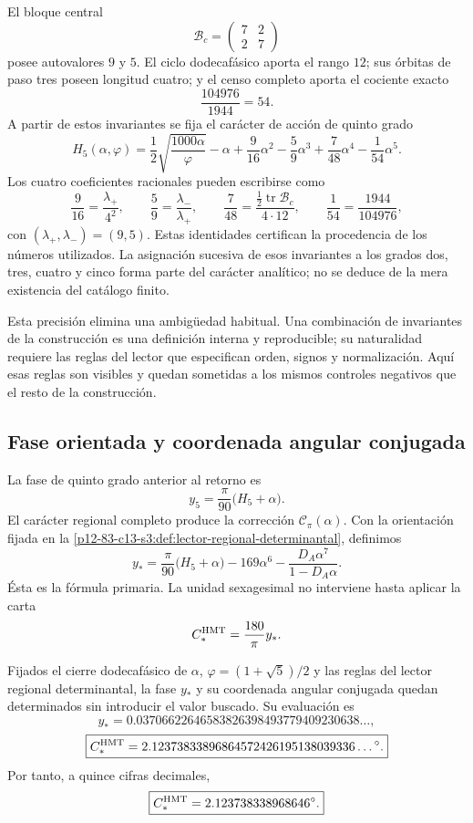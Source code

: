 El bloque central
\[
\mathcal B_c=\begin{pmatrix}7&2\\2&7\end{pmatrix}
\]
posee autovalores \(9\) y \(5\). El ciclo dodecafásico aporta el rango
\(12\); sus órbitas de paso tres poseen longitud cuatro; y el censo completo
aporta el cociente exacto
\[
\frac{104976}{1944}=54.
\]
A partir de estos invariantes se fija el carácter de acción de quinto grado
\[
\boxed{
H_5(\alpha,\varphi)
=\frac12\sqrt{\frac{1000\alpha}{\varphi}}-\alpha
+\frac9{16}\alpha^2-\frac59\alpha^3
+\frac7{48}\alpha^4-\frac1{54}\alpha^5.}
\]
Los cuatro coeficientes racionales pueden escribirse como
\[
\frac9{16}=\frac{\lambda_+}{4^2},
\qquad
\frac59=\frac{\lambda_-}{\lambda_+},
\qquad
\frac7{48}=\frac{\tfrac12\operatorname{tr}\mathcal B_c}{4\cdot12},
\qquad
\frac1{54}=\frac{1944}{104976},
\]
con \((\lambda_+,\lambda_-)=(9,5)\). Estas identidades certifican la
procedencia de los números utilizados. La asignación sucesiva de esos
invariantes a los grados dos, tres, cuatro y cinco forma parte del carácter
analítico; no se deduce de la mera existencia del catálogo finito.

Esta precisión elimina una ambigüedad habitual. Una combinación de
invariantes de la construcción es una definición interna y reproducible; su
naturalidad requiere las reglas del lector que especifican orden, signos y
normalización. Aquí esas reglas son visibles y quedan sometidas a los mismos
controles negativos que el resto de la construcción.

\subsection{Fase orientada y coordenada angular conjugada}

La fase de quinto grado anterior al retorno es
\[
y_5=\frac\pi{90}\bigl(H_5+\alpha\bigr).
\]
El carácter regional completo produce la corrección
\(\mathscr C_\pi(\alpha)\). Con la orientación fijada en la
\cref{p12-83-c13-s3:def:lector-regional-determinantal}, definimos
\[
\boxed{
y_*=\frac\pi{90}\bigl(H_5+\alpha\bigr)
-169\alpha^6
-\frac{D_A\alpha^7}{1-D_A\alpha}.}
\]
Ésta es la fórmula primaria. La unidad sexagesimal no interviene hasta aplicar la carta
\[
C_*^{\rm HMT}=\frac{180}{\pi}y_*.
\]

\begin{theorem}
\label{p12-83-c13-s3:thm:contraangulo-regional}
Fijados el cierre dodecafásico de \(\alpha\),
\(\varphi=(1+\sqrt5)/2\) y las reglas del lector regional determinantal, la
fase \(y_*\) y su coordenada angular conjugada quedan determinados sin introducir el valor
buscado. Su evaluación es
\[
\boxed{
y_*=0.03706622646583826398493779409230638\ldots,}
\]
\[
\boxed{
C_*^{\rm HMT}
=2.12373833896864572426195138039336\ldots{}^\circ.}
\]
Por tanto, a quince cifras decimales,
\[
\boxed{C_*^{\rm HMT}=2.123738338968646^\circ.}
\]
\end{theorem}

